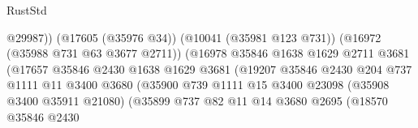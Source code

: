 \begin{lexlean}{RustStd}
\begin{coremodule}
                                                    @29987))
                                                (@17605 (@35976 @34))
                                                (@10041 (@35981 @123 @731))
                                                (@16972 (@35988 @731 @63 @3677 @2711))
                                                (@16978
                                                  @35846
                                                  @1638
                                                  @1629
                                                  @2711
                                                  @3681
                                                  (@17657
                                                    @35846
                                                    @2430
                                                    @1638
                                                    @1629
                                                    @3681
                                                    (@19207
                                                      @35846
                                                      @2430
                                                      @204
                                                      @737
                                                      @1111
                                                      @11
                                                      @3400
                                                      @3680
                                                      (@35900
                                                        @739
                                                        @1111
                                                        @15
                                                        @3400
                                                        @23098
                                                        (@35908 @3400 @35911 @21080)
                                                        (@35899
                                                          @737
                                                          @82
                                                          @11
                                                          @14
                                                          @3680
                                                          @2695
                                                          (@18570
                                                            @35846
                                                            @2430

\end{coremodule}
\end{lexlean}
